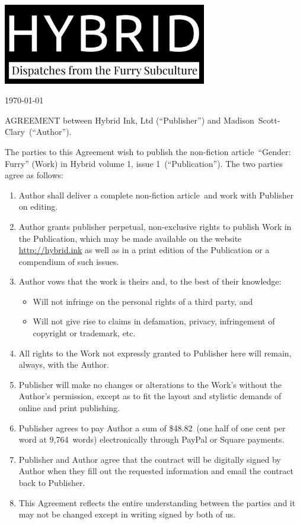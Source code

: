 \documentclass[12pt,letterpaper,oneside]{article}
\def\authorfirst{Madison}
\def\authorlast{Scott-Clary}
\def\worktitle{Gender: Furry}
\def\worktype{non-fiction article}
\def\workwords{9,764}
\def\issue{volume 1, issue 1}
\def\fee{\$48.82}
\def\rate{one half of one cent per word at \workwords\ words}
\begin{document}
  \noindent\includegraphics[width=3.5in]{logo}

  \vspace{.5in}

  \today

  \vspace{.5in}

  AGREEMENT between Hybrid Ink, Ltd (``Publisher'') and \authorfirst\ \authorlast\ (``Author'').

  The parties to this Agreement wish to publish the \worktype\ ``\worktitle'' (Work) in Hybrid \issue\ (``Publication''). The two parties agree as follows:

  \begin{enumerate}
    \item Author shall deliver a complete \worktype\ and work with Publisher on editing.
    \item Author grants publisher perpetual, non-exclusive rights to publish Work in the Publication, which may be made available on the website \url{http://hybrid.ink} as well as in a print edition of the Publication or a compendium of such issues.
    \item Author vows that the work is theirs and, to the best of their knowledge:
    \begin{itemize}
      \item Will not infringe on the personal rights of a third party, and
      \item Will not give rise to claims in defamation, privacy, infringement of copyright or trademark, etc.
    \end{itemize}
    \item All rights to the Work not expressly granted to Publisher here will remain, always, with the Author.
    \item Publisher will make no changes or alterations to the Work's without the Author’s permission, except as to fit the layout and stylistic demands of online and print publishing.
    \item Publisher agrees to pay Author a sum of \fee\ (\rate) electronically through PayPal or Square payments.
    \item Publisher and Author agree that the contract will be digitally signed by Author when they fill out the requested information and email the contract back to Publisher.
    \item This Agreement reflects the entire understanding between the parties and it may not be changed except in writing signed by both of us.
  \end{enumerate}
\end{document}
